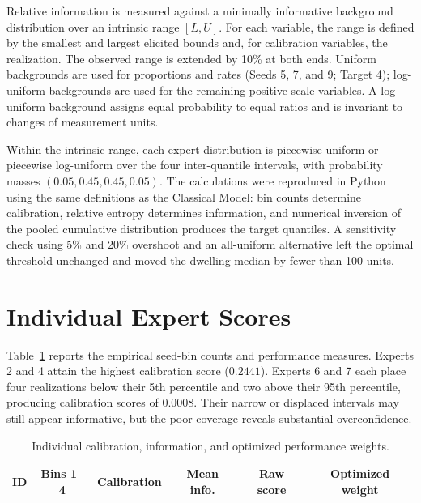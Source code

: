 Relative information is measured against a minimally informative background distribution over an intrinsic range $[L,U]$. For each variable, the range is defined by the smallest and largest elicited bounds and, for calibration variables, the realization. The observed range is extended by 10\% at both ends. Uniform backgrounds are used for proportions and rates (Seeds 5, 7, and 9; Target 4); log-uniform backgrounds are used for the remaining positive scale variables. A log-uniform background assigns equal probability to equal ratios and is invariant to changes of measurement units.

Within the intrinsic range, each expert distribution is piecewise uniform or piecewise log-uniform over the four inter-quantile intervals, with probability masses $(0.05,0.45,0.45,0.05)$. The calculations were reproduced in Python using the same definitions as the Classical Model: bin counts determine calibration, relative entropy determines information, and numerical inversion of the pooled cumulative distribution produces the target quantiles. A sensitivity check using 5\% and 20\% overshoot and an all-uniform alternative left the optimal threshold unchanged and moved the dwelling median by fewer than 100 units.

\section{Individual Expert Scores}
\label{sec:individual_scores}

Table~\ref{tab:expert_performance_results} reports the empirical seed-bin counts and performance measures. Experts 2 and 4 attain the highest calibration score ($0.2441$). Experts 6 and 7 each place four realizations below their 5th percentile and two above their 95th percentile, producing calibration scores of $0.0008$. Their narrow or displaced intervals may still appear informative, but the poor coverage reveals substantial overconfidence.

\begin{table}[htbp]
    \centering
    \scriptsize
    \begin{tabular}{lccccc}
        \toprule
        \textbf{ID} & \textbf{Bins 1--4} & \textbf{Calibration} & \textbf{Mean info.} & \textbf{Raw score} & \textbf{Optimized weight} \\
        \midrule
        
    \end{tabular}
    \caption{Individual calibration, information, and optimized performance weights.}
    \label{tab:expert_performance_results}
\end{table}


